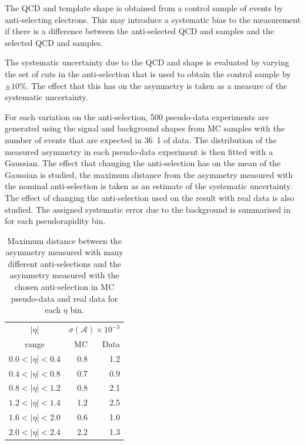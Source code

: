 The {QCD} and \gjet \ETm template shape is obtained from a control sample of
events by anti-selecting electrons. This may introduce a systematic bias to the
measurement if there is a difference between the anti-selected {QCD} and \gjet
\ETm samples and the selected {QCD} and \gjet samples.

The systematic uncertainty due to the {QCD} and \gjet \ETm shape is evaluated by
varying the set of cuts in the anti-selection that is used to obtain the control
sample by $\pm10\%$. The effect that this has on the asymmetry is taken
as a measure of the systematic uncertainty.

For each variation on the anti-selection, 500 pseudo-data experiments are
generated using the signal and background \ETm shapes from MC samples with the
number of events that are expected in \unit{36.1}{\invpb} of data. The
distribution of the measured asymmetry in each pseudo-data experiment is then
fitted with a Gaussian.  The effect that changing the anti-selection has on the
mean of the Gaussian is studied, the maximum distance from the asymmetry
measured with the nominal anti-selection is taken as an estimate of the
systematic uncertainty.  The effect of changing the anti-selection used on the
result with real data is also studied.  The assigned systematic error due to the
background is summarised in  for each pseudorapidity bin.

\begin{table}[htbp]
\begin{center}
\begin{tabular}{crr}
    \toprule
$|\eta|$  &\multicolumn{2}{c}{ $\sigma(\mathcal{A}) \times 10^{-3}$}\\
   range      & MC & Data\\
\midrule
$0.0<|\eta|<0.4$ & 0.8 & 1.2\\
$0.4<|\eta|<0.8$ & 0.7 & 0.9\\
$0.8<|\eta|<1.2$ & 0.8 & 2.1\\
$1.2<|\eta|<1.4$ & 1.2 & 2.5\\
$1.6<|\eta|<2.0$ & 0.6 & 1.0\\
$2.0<|\eta|<2.4$ & 2.2 & 1.3\\
    \bottomrule
\end{tabular}
\caption{Maximum distance between the asymmetry measured with many different anti-selections
and the asymmetry measured with the chosen anti-selection in MC pseudo-data and
real data for each $\eta$ bin\cite{baisini2010electron}.}
\label{tab:systQCD}
\end{center}
\end{table}

